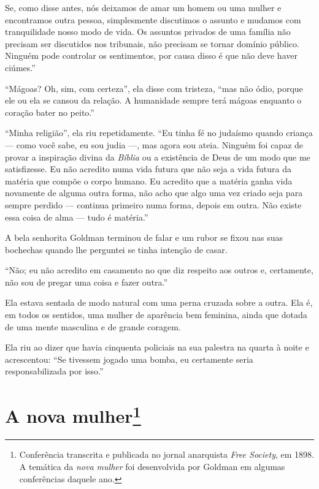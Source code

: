 Se, como disse antes, nós deixamos de amar um homem ou uma
mulher e encontramos outra pessoa, simplesmente discutimos o assunto e mudamos
com tranquilidade nosso modo de vida. Os assuntos privados de uma família
não precisam ser discutidos nos tribunais, não precisam se tornar
domínio público. Ninguém pode controlar os sentimentos, por causa disso
é que não deve haver ciúmes.''

``Mágoas? Oh, sim, com certeza'', ela disse com tristeza, ``mas não
ódio, porque ele ou ela se cansou da relação. A humanidade sempre terá
mágoas enquanto o coração bater no peito.''

``Minha religião'', ela riu repetidamente. ``Eu tinha fé no judaísmo
quando criança --- como você sabe, eu sou judia ---, mas agora sou ateia.
Ninguém foi capaz de provar a inspiração divina da \textit{Bíblia} ou a
existência de Deus de um modo que me satisfizesse. Eu não acredito numa
vida futura que não seja a vida futura da matéria que compõe o corpo
humano. Eu acredito que a matéria ganha vida novamente de alguma outra
forma, não acho que algo uma vez criado seja para sempre perdido --- continua primeiro numa forma, depois em outra. Não existe essa
coisa de alma --- tudo é matéria.''

A bela senhorita Goldman terminou de falar e um rubor se fixou nas suas
bochechas quando lhe perguntei se tinha intenção de casar.

``Não; eu não acredito em casamento no que diz respeito aos outros e,
certamente, não sou de pregar uma coisa e fazer outra.''

Ela estava sentada de modo natural com uma perna cruzada sobre a outra.
Ela é, em todos os sentidos, uma mulher de aparência bem feminina, ainda
que dotada de uma mente masculina e de grande coragem.

Ela riu ao dizer que havia cinquenta policiais na sua palestra na quarta
à noite e acrescentou: ``Se tivessem jogado uma bomba, eu certamente
seria responsabilizada por isso.''

\chapter{A nova mulher\footnote{Conferência transcrita e publicada no jornal
  anarquista \textit{Free Society}, em 1898. A temática da \textit{nova mulher} foi
  desenvolvida por Goldman em algumas conferências daquele ano.}}

